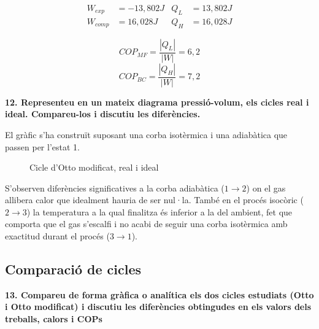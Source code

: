 \documentclass[a4paper]{article}
\begin{document}
\begin{align*}
	W_{exp} &= -13,802 J &  Q_L &= 13,802 J \\
	W_{comp} &= 16,028 J &  Q_H &= 16,028 J
\end{align*}

$$ COP_{MF} = \frac{|Q_L|}{|W|} = 6,2 $$
$$ COP_{BC} = \frac{|Q_H|}{|W|} = 7,2 $$

\textbf{12. Representeu en un mateix diagrama pressió-volum, els cicles real i ideal. Compareu-los i discutiu les diferències.}

El gràfic s’ha construït suposant una corba isotèrmica i una adiabàtica que passen per l’estat 1.

\begin{figure}[H]
	\centering
	\caption{Cicle d'Otto modificat, real i ideal}
	\label{fig:otto_modificat}
\end{figure}

S’observen diferències significatives a la corba adiabàtica ($1 \rightarrow 2$) on el gas allibera calor que idealment hauria de ser nul·la. També en el procés isocòric ($2\rightarrow3$) la temperatura a la qual finalitza és inferior a la del ambient, fet que comporta que el gas s’escalfi i no acabi de seguir una corba isotèrmica amb exactitud durant el procés ($3\rightarrow1$).

\subsection*{Comparació de cicles}	

\textbf{13. Compareu de forma gràfica o analítica els dos cicles estudiats (Otto i Otto modificat) i discutiu les diferències obtingudes en els valors dels treballs, calors i COPs}
\end{document}
